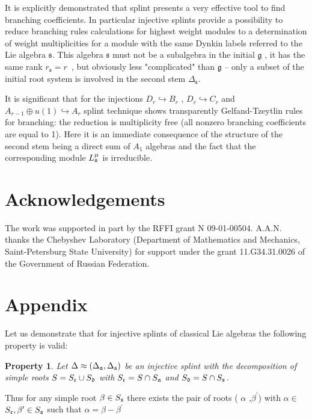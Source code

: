 \documentclass[12pt]{article}
\newtheorem{Prop}[Def]{Property}
\begin{document}
\label{sec:conclusions}It is explicitly demonstrated that splint
presents a very effective tool to find branching coefficients. In
particular injective splints provide a possibility to reduce
branching rules calculations for highest weight modules to a
determination of weight multiplicities for a module with the same
Dynkin labels referred to the Lie algebra $\mathfrak{s}$. This algebra
$\mathfrak{s}$ must not be a subalgebra in the initial $\mathfrak{g}$ , it
has the same rank $r_{\mathfrak{s}}=r$\ , but obviously less
"complicated" than $\mathfrak{g}$ -- only a subset of the initial root system is involved in the second stem $\Delta_{\mathfrak{s}}$.

It is significant that for the injections $D_{r}\hookrightarrow B_{r}$ , $%
D_{r}\hookrightarrow C_{r}$ and $A_{r-1}\oplus u\left( 1\right) \hookrightarrow A_{r}$ splint technique shows
transparently Gelfand-Tzeytlin rules for branching:  the reduction is
multiplicity free (all nonzero
branching coefficients are equal to 1). Here it is an immediate consequence of the
structure of the second stem being a direct sum of $A_{1}$
algebras and the fact that the corresponding module
$L_{\frak{s}}^{\mu }$ is irreducible.

\section*{Acknowledgements}
\label{sec:acknowledgements}
The work was supported in part by the
RFFI grant N 09-01-00504. A.A.N. thanks 
the Chebyshev Laboratory (Department of Mathematics and Mechanics,
Saint-Petersburg State University) for support under the grant 11.G34.31.0026
of the Government of Russian Federation.


{}




\section*{Appendix}


Let us demonstrate that for injective splints of classical Lie
algebras the following property is valid:
\begin{Prop}
Let $\Delta \approx (\Delta _{\frak{a}},\Delta _{\frak{s}})$ be an
injective
splint with the decomposition of simple roots $S=S_{\frak{c}}\cup S_{\frak{d}%
}$ with $S_{\frak{c}}=S\cap S_{\frak{a}}$ and $S_{\frak{d}}=S\cap S_{\frak{s}%
}$.
\end{Prop}
Thus for any simple root $\beta \in S_{\frak{s}}$ there exists the
pair of
roots ( $\alpha $ ,$\beta ^{\prime }$) with $\alpha \in $ $S_{\frak{c}%
},\beta ^{\prime }\in S_{\frak{s}}$ such that $\alpha =\beta
-\beta ^{\prime }$
\end{document}
